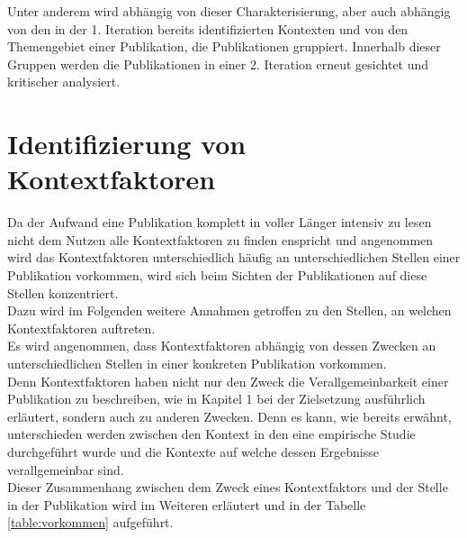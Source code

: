 Unter anderem wird abhängig von dieser Charakterisierung, aber auch abhängig von den in der 1. Iteration bereits identifizierten Kontexten und von den Themengebiet einer Publikation, die Publikationen gruppiert. Innerhalb dieser Gruppen werden die Publikationen in einer 2. Iteration erneut gesichtet und kritischer analysiert. \\



\section{Identifizierung von Kontextfaktoren}
Da der Aufwand eine Publikation komplett in voller Länger intensiv zu lesen nicht dem Nutzen alle Kontextfaktoren zu finden enspricht und angenommen wird das Kontextfaktoren unterschiedlich häufig an unterschiedlichen Stellen einer Publikation vorkommen, wird sich beim Sichten der Publikationen auf diese Stellen konzentriert. \\
Dazu wird im Folgenden weitere Annahmen getroffen zu den Stellen, an welchen Kontextfaktoren auftreten. \\

Es wird angenommen, dass Kontextfaktoren abhängig von dessen Zwecken an unterschiedlichen Stellen in einer konkreten Publikation vorkommen. \\
Denn Kontextfaktoren haben nicht nur den Zweck die Verallgemeinbarkeit einer Publikation zu beschreiben, wie in Kapitel 1 bei der Zielsetzung ausführlich erläutert, sondern auch zu anderen Zwecken. Denn es kann, wie bereits erwähnt, unterschieden werden zwischen den Kontext in den eine empirische Studie durchgeführt wurde und die Kontexte auf welche dessen Ergebnisse verallgemeinbar sind. \\
Dieser Zusammenhang zwischen dem Zweck eines Kontextfaktors und der Stelle in der Publikation wird im Weiteren erläutert und in der Tabelle \ref{table:vorkommen} aufgeführt. \\

